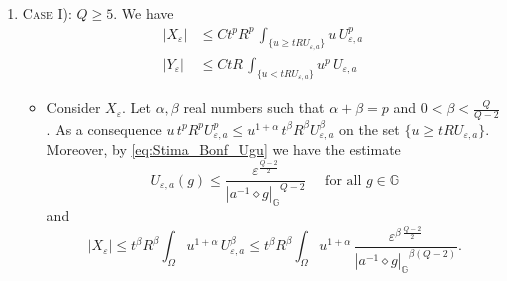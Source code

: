 \documentclass[11pt]{amsart}
\numberwithin{equation}{section} %
\theoremstyle{definition}
\newcommand{\al}{\alpha}
\def\G{\mathbb{G}}
\begin{document}
\begin{enumerate}
\item \textsc{Case I): $Q\geq 5$}. We have
\begin{align*}
    |X_\varepsilon|&\leq Ct^pR^p\, \int_{\{u\geq tRU_{\varepsilon,a}\}}u\, U_{\varepsilon,a}^p\\
    |Y_\varepsilon|&\leq CtR\, \int_{\{u<tRU_{\varepsilon,a}\}}u^p\, U_{\varepsilon,a}
\end{align*}
\begin{itemize}
   \item Consider $X_\varepsilon$. Let $\alpha,\beta$ real numbers such that $\alpha+\beta=p$ and $0<\beta<\frac{Q}{Q-2}$.
   As a consequence $u\, t^pR^pU_{\varepsilon,a}^p\leq u^{1+\al}\, t^\beta R^\beta U_{\varepsilon,a}^\beta$ on the set $\{u\geq tRU_{\varepsilon,a}\}$.
    Moreover, by \eqref{eq:Stima_Bonf_Ugu} we have the estimate
    \[
    U_{\varepsilon,a}(g)\leq\frac{\varepsilon^{\frac{Q-2}{2}}}{{|a^{-1}\diamond g|_{\mathbb{G}}}^{Q-2}}\quad \textrm{ for all } g\in\G
    \]
    and
    \[
    |X_\varepsilon|\leq t^\beta R^\beta\int_\Omega u^{1+\al}\, U_{\varepsilon,a}^\beta
    \leq t^\beta R^\beta\int_\Omega u^{1+\al}\, \frac{\varepsilon^{\beta \,\frac{Q-2}{2}}}{{|a^{-1}\diamond g|_{\mathbb{G}}}^{\beta(Q-2) }}.
    \]
    

\end{itemize}
\end{enumerate}
\end{document}
